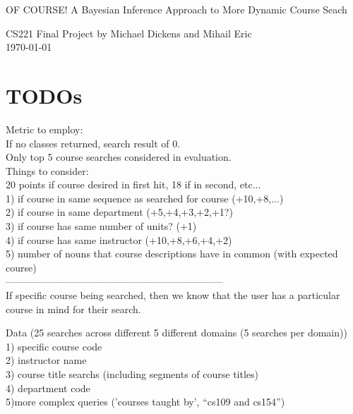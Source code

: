 \documentclass[12pt]{article}
\begin{document}
\begin{center}
{\Large OF COURSE! A Bayesian Inference Approach to More Dynamic Course Seach}
\begin{center}
{\normalsize CS221 Final Project by Michael Dickens and Mihail Eric}\\
\today 
\end{center}

\end{center}



\section*{TODOs}

%
Metric to employ: \\
If no classes returned, search result of 0.\\

Only top 5 course searches considered in evaluation.\\

Things to consider:\\
20 points if course desired in first hit, 18 if in second, etc...\\
1) if course in same sequence as searched for course (+10,+8,...)\\
2) if course in same department (+5,+4,+3,+2,+1?)\\
3) if course has same number of units? (+1)\\
4) if course has same instructor (+10,+8,+6,+4,+2)\\
5) number of nouns that course descriptions have in common (with expected course)\\
------------------------------------------------------------------\\
If specific course being searched, then we know that the user has a particular course in mind for their search.

Data (25 searches across different 5 different domains (5 searches per domain))\\
1) specific course code\\
2) instructor name\\
3) course title searchs (including segments of course titles)\\
4) department code\\
5)more complex queries ('courses taught by', ``cs109 and cs154'')
\end{document}
